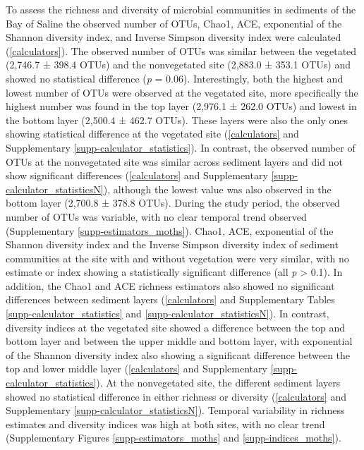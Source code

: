 \documentclass[12pt,]{article}
\begin{document}
To assess the richness and diversity of microbial communities in
sediments of the Bay of Saline the observed number of OTUs, Chao1, ACE,
exponential of the Shannon diversity index, and Inverse Simpson
diversity index were calculated (\autoref{calculators}). The observed
number of OTUs was similar between the vegetated (2,746.7 ± 398.4 OTUs)
and the nonvegetated site (2,883.0 ± 353.1 OTUs) and showed no
statistical difference (\emph{p} = 0.06). Interestingly, both the
highest and lowest number of OTUs were observed at the vegetated site,
more specifically the highest number was found in the top layer (2,976.1
± 262.0 OTUs) and lowest in the bottom layer (2,500.4 ± 462.7 OTUs).
These layers were also the only ones showing statistical difference at
the vegetated site (\autoref{calculators} and Supplementary
\autoref{supp-calculator_statistics}). In contrast, the observed number
of OTUs at the nonvegetated site was similar across sediment layers and
did not show significant differences (\autoref{calculators} and
Supplementary \autoref{supp-calculator_statisticsN}), although the
lowest value was also observed in the bottom layer (2,700.8 ± 378.8
OTUs). During the study period, the observed number of OTUs was
variable, with no clear temporal trend observed (Supplementary
\autoref{supp-estimators_moths}). Chao1, ACE, exponential of the Shannon
diversity index and the Inverse Simpson diversity index of sediment
communities at the site with and without vegetation were very similar,
with no estimate or index showing a statistically significant difference
(all \emph{p} \textgreater{} 0.1). In addition, the Chao1 and ACE
richness estimators also showed no significant differences between
sediment layers (\autoref{calculators} and Supplementary Tables
\ref{supp-calculator_statistics} and \ref{supp-calculator_statisticsN}).
In contrast, diversity indices at the vegetated site showed a difference
between the top and bottom layer and between the upper middle and bottom
layer, with exponential of the Shannon diversity index also showing a
significant difference between the top and lower middle layer
(\autoref{calculators} and Supplementary
\autoref{supp-calculator_statistics}). At the nonvegetated site, the
different sediment layers showed no statistical difference in either
richness or diversity (\autoref{calculators} and Supplementary
\autoref{supp-calculator_statisticsN}). Temporal variability in richness
estimates and diversity indices was high at both sites, with no clear
trend (Supplementary Figures \ref{supp-estimators_moths} and
\ref{supp-indices_moths}).
\end{document}
